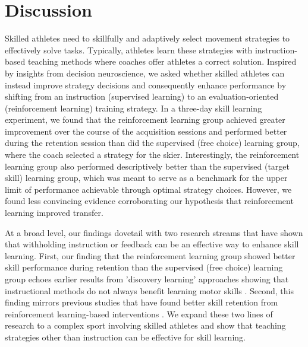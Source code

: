 \documentclass[pdflatex,sn-nature]{sn-jnl}%
\theoremstyle{thmstyleone}%
\theoremstyle{thmstyletwo}%
\theoremstyle{thmstylethree}%
\begin{document}
\section{Discussion}
Skilled athletes need to skillfully and adaptively select movement strategies to effectively solve tasks. Typically, athletes learn these strategies with instruction-based teaching methods where coaches offer athletes a correct solution. Inspired by insights from decision neuroscience, we asked whether skilled athletes can instead improve strategy decisions and consequently enhance performance by shifting from an instruction (supervised learning) to an evaluation-oriented (reinforcement learning) training strategy. In a three-day skill learning experiment, we found that the reinforcement learning group achieved greater improvement over the course of the acquisition sessions and performed better during the retention session than did the supervised (free choice) learning group, where the coach selected a strategy for the skier. Interestingly, the reinforcement learning group also performed descriptively better than the supervised (target skill) learning group, which was meant to serve as a benchmark for the upper limit of performance achievable through optimal strategy choices. However, we found less convincing evidence corroborating our hypothesis that reinforcement learning improved transfer.

At a broad level, our findings dovetail with two research streams that have shown that withholding instruction or feedback can be an effective way to enhance skill learning. First, our finding that the reinforcement learning group showed better skill performance during retention than the supervised (free choice) learning group echoes earlier results from 'discovery learning' approaches showing that instructional methods do not always benefit learning motor skills \cite{wulf_instructions_1997, hodges_learning_2001, hodges_role_1999, vereijken_defence_1990}. Second, this finding mirrors previous studies that have found better skill retention from reinforcement learning-based interventions \cite{therrien_effective_2016, truong_error-based_2023, hasson_reinforcement_2015, lior_shmuelof_overcoming_2012}. We expand these two lines of research to a complex sport involving skilled athletes and show that teaching strategies other than instruction can be effective for skill learning. 
\end{document}
